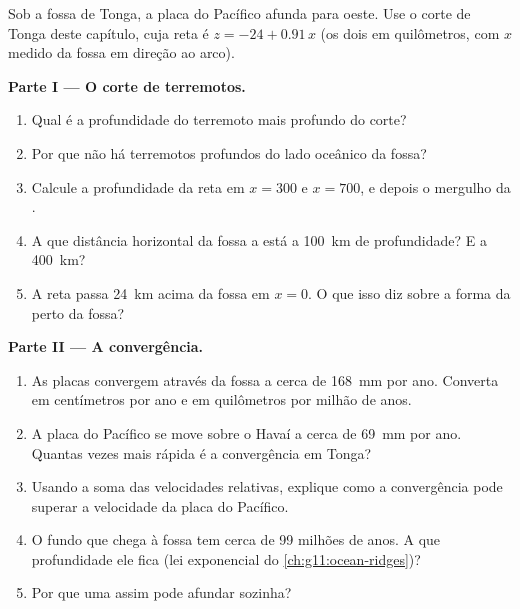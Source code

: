 \begin{problem}
\label{pb:g11:subduction-zones:1}
Sob a fossa de Tonga, a placa do Pacífico afunda para oeste. Use o corte de
Tonga deste capítulo, cuja reta é $z = -24 + 0.91\,x$ (os dois em
quilômetros, com $x$ medido da fossa em direção ao arco).

\medskip
\noindent\textbf{Parte I --- O corte de terremotos.}
\begin{enumerate}
  \item Qual é a profundidade do terremoto mais profundo do corte?
  \item Por que não há terremotos profundos do lado oceânico da fossa?
  \item Calcule a profundidade da reta em $x = 300$ e $x = 700$, e depois o
        mergulho da .
  \item A que distância horizontal da fossa a  está a \qty{100}{km} de
        profundidade? E a \qty{400}{km}?
  \item A reta passa \qty{24}{km} acima da fossa em $x = 0$. O que isso diz
        sobre a forma da  perto da fossa?
\end{enumerate}

\medskip
\noindent\textbf{Parte II --- A convergência.}
\begin{enumerate}[resume]
  \item As placas convergem através da fossa a cerca de \qty{168}{mm} por
        ano. Converta em centímetros por ano e em quilômetros por milhão de
        anos.
  \item A placa do Pacífico se move sobre o Havaí a cerca de \qty{69}{mm}
        por ano. Quantas vezes mais rápida é a convergência em Tonga?
  \item Usando a soma das velocidades relativas, explique como a
        convergência pode superar a velocidade da placa do Pacífico.
  \item O fundo que chega à fossa tem cerca de 99 milhões de anos. A que
        profundidade ele fica (lei exponencial do \cref{ch:g11:ocean-ridges})?
  \item Por que uma  assim pode afundar sozinha?
\end{enumerate}


\end{problem}
